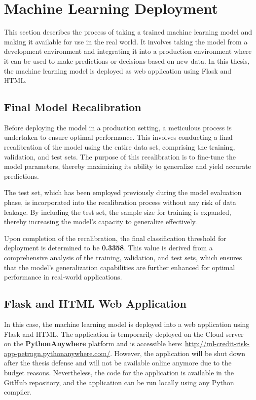 \newpage
\section{Machine Learning Deployment}
This section describes the process of taking a trained machine learning model and making it available for use in the real world. It involves taking the model from a development environment and integrating it into a production environment where it can be used to make predictions or decisions based on new data. In this thesis, the machine learning model is deployed as web application using Flask and HTML.
\subsection{Final Model Recalibration}
Before deploying the model in a production setting, a meticulous process is undertaken to ensure optimal performance.
This involves conducting a final recalibration of the model using the entire data set, comprising the training, validation, and test sets.
The purpose of this recalibration is to fine-tune the model parameters, thereby maximizing its ability to generalize and yield accurate predictions.

The test set, which has been employed previously during the model evaluation phase, is incorporated into the recalibration process without any risk of data leakage.
By including the test set, the sample size for training is expanded, thereby increasing the model's capacity to generalize effectively.

Upon completion of the recalibration, the final classification threshold for deployment is determined to be \textbf{0.3358}.
This value is derived from a comprehensive analysis of the training, validation, and test sets, which ensures that the model's generalization capabilities are further enhanced for optimal performance in real-world applications.

\subsection{Flask and HTML Web Application}

In this case, the machine learning model is deployed into a web application using Flask and HTML. The application is temporarily deployed on the Cloud server on the \textbf{PythonAnywhere} platform and is accessible here: \url{http://ml-credit-risk-app-petrngn.pythonanywhere.com/}.
However, the application will be shut down after the thesis defense and will not be available online anymore due to the budget reasons.
Nevertheless, the code for the application is available in the GitHub repository, and the application can be run locally using any Python compiler.

